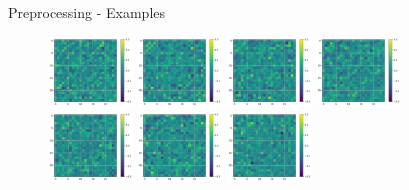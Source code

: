 \documentclass{beamer}
\begin{document}
\begin{frame}{Preprocessing - Examples}

    \begin{figure}[H]
        \centering
        \includegraphics[width=0.2\textwidth]{../Analysis/DFC/size=480_step=180_rho=0.1/node=25_id=100206/c_0.jpg}
        \includegraphics[width=0.2\textwidth]{../Analysis/DFC/size=480_step=180_rho=0.1/node=25_id=100206/c_2.jpg}
        \includegraphics[width=0.2\textwidth]{../Analysis/DFC/size=480_step=180_rho=0.1/node=25_id=100206/c_4.jpg}
        \includegraphics[width=0.2\textwidth]{../Analysis/DFC/size=480_step=180_rho=0.1/node=25_id=100206/c_6.jpg} \\
        \includegraphics[width=0.2\textwidth]{../Analysis/DFC/size=480_step=180_rho=0.1/node=25_id=100206/c_8.jpg}
        \includegraphics[width=0.2\textwidth]{../Analysis/DFC/size=480_step=180_rho=0.1/node=25_id=100206/c_10.jpg}
        \includegraphics[width=0.2\textwidth]{../Analysis/DFC/size=480_step=180_rho=0.1/node=25_id=100206/c_12.jpg}

\end{figure}
\end{frame}
\end{document}
